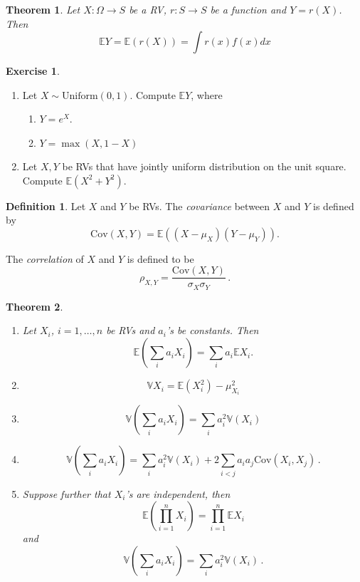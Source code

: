 \documentclass[
  openany]{book}
\providecommand{\tightlist}{%
  \setlength{\itemsep}{0pt}\setlength{\parskip}{0pt}}
\newtheorem{theorem}{Theorem}[chapter]
\theoremstyle{definition}
\newtheorem{definition}{Definition}[chapter]
\theoremstyle{definition}
\theoremstyle{definition}
\newtheorem{exercise}{Exercise}[chapter]
\theoremstyle{definition}
\theoremstyle{remark}
\begin{document}
\begin{theorem}
Let \(X:\Omega \to S\) be a RV, \(r: S \to S\) be a function and \(Y = r(X)\).
Then \[ \mathbb{E}Y = \mathbb{E}(r(X)) = \int r(x) f(x)  dx \]
\end{theorem}

\begin{exercise}
\leavevmode

\begin{enumerate}
\def\labelenumi{\arabic{enumi}.}
\tightlist
\item
  Let \(X \sim \text{Uniform}(0,1)\). Compute \(\mathbb{E}Y\), where

  \begin{enumerate}
  \def\labelenumii{\alph{enumii}.}
  \tightlist
  \item
    \(Y = e^X\).
  \item
    \(Y = \max(X, 1-X)\)
  \end{enumerate}
\item
  Let \(X,Y\) be RVs that have jointly uniform distribution on the unit square.
  Compute \(\mathbb{E}(X^2 + Y^2)\).
\end{enumerate}

\end{exercise}

\begin{definition}
Let \(X\) and \(Y\) be RVs. The \emph{covariance} between \(X\) and \(Y\) is defined by
\[ \mathrm{Cov}(X,Y) = \mathbb{E}\left( (X- \mu_X)(Y - \mu_Y)   \right) .\]

The \emph{correlation} of \(X\) and \(Y\) is defined to be
\[ \rho_{X,Y} = \frac{\mathrm{Cov}(X,Y)}{\sigma_X \sigma_Y} \,.\]
\end{definition}

\begin{theorem}
\leavevmode

\begin{enumerate}
\def\labelenumi{\arabic{enumi}.}
\item
  Let \(X_i\), \(i=1, \dots, n\) be RVs and \(a_i\)'s be constants.
  Then
  \[ \mathbb{E}\left(\sum_i a_i X_i \right) = \sum_i a_i \mathbb{E}X_i. \]
\item
  \[ \mathbb{V}X_i = \mathbb{E}(X_i^2) - \mu_{X_i}^2 \]
\item
  \[ \mathbb{V}\left( \sum_i a_i X_i  \right) = \sum_i a_i^2 \mathbb{V}(X_i) \]
\item
  \[ \mathbb{V}\left( \sum_i a_i X_i  \right) = \sum_i a_i^2 \mathbb{V}(X_i) + 2\sum_{i<j} a_i a_j \mathrm{Cov}(X_i, X_j) \,. \]
\item
  Suppose further that \(X_i\)'s are independent, then
  \[ \mathbb{E}\left( \prod_{i=1}^n X_i  \right) = \prod_{i=1}^n \mathbb{E}X_i\]
  and
  \[ \mathbb{V}\left( \sum_i a_i X_i  \right) = \sum_i a_i^2 \mathbb{V}(X_i) \,. \]
\end{enumerate}

\end{theorem}
\end{document}
